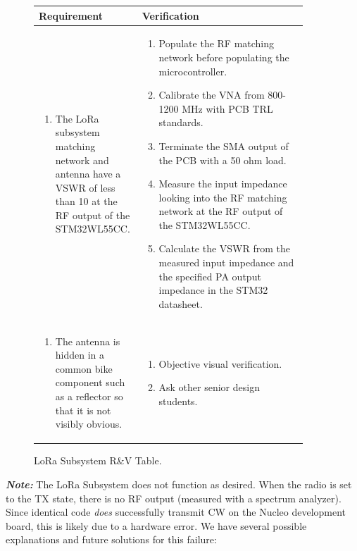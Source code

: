 \documentclass{article}
\begin{document}
\begin{figure}[H]
	\begin{center}
		\begin{tabular}{|p{0.3 \linewidth}|p{0.6 \linewidth}|}
			\hline
			Requirement & Verification  \\
			\hline
			\begin{enumerate}
				\item The LoRa subsystem matching network and antenna have a VSWR of less than 10 at the RF output of the STM32WL55CC. 
			\end{enumerate}  & \begin{enumerate} 
				\item Populate the RF matching network before populating the microcontroller.
				\item Calibrate the VNA from 800-1200 MHz with PCB TRL standards. 
				\item Terminate the SMA output of the PCB with a 50 ohm load.
				\item Measure the input impedance looking into the RF matching network at the RF output of the STM32WL55CC.
				\item Calculate the VSWR from the measured input impedance and the specified PA output impedance in the STM32 datasheet. 
			\end{enumerate}
			\\
			\hline
			\begin{enumerate}
				\item The antenna is hidden in a common bike component such as a reflector so that it is not visibly obvious. 
			\end{enumerate}  & \begin{enumerate}
				\item Objective visual verification. 
				\item Ask other senior design students.
			\end{enumerate} \\
			\hline
		\end{tabular}
	\end{center}
	\caption{LoRa Subsystem R\&V Table.}
\end{figure}

\textit{\textbf{Note:}} The LoRa Subsystem does not function as desired. When the radio is set to the TX state, there is no RF output (measured with a spectrum analyzer). Since identical code \textit{does} successfully transmit CW on the Nucleo development board, this is likely due to a hardware error. We have several possible explanations and future solutions for this failure: 
\end{document}
